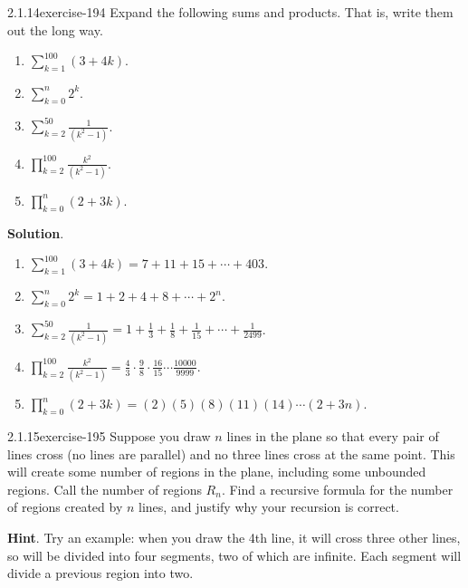 \documentclass[twoside,11pt,]{book}
\numberwithin{equation}{chapter}
\renewcommand{\d}{\displaystyle}
\begin{document}
\begin{divisionsolution}{2.1.14}{}{exercise-194}%
\hypertarget{p-3042}{}%
Expand the following sums and products. That is, write them out the long way.\leavevmode%
\begin{multicols}{2}
\begin{enumerate}[label=(\alph*)]
\item\hypertarget{li-1791}{}\(\d\sum_{k=1}^{100} (3+4k)\).%
\item\hypertarget{li-1792}{}\(\d\sum_{k=0}^n 2^k\).%
\item\hypertarget{li-1793}{}\(\d\sum_{k=2}^{50}\frac{1}{(k^2 - 1)}\).%
\item\hypertarget{li-1794}{}\(\d\prod_{k=2}^{100}\frac{k^2}{(k^2-1)}\).%
\item\hypertarget{li-1795}{}\(\d\prod_{k=0}^n (2+3k)\).%
\end{enumerate}
\end{multicols}
%
\par\smallskip%
\noindent\textbf{Solution}.\quad%
\hypertarget{p-3043}{}%
\leavevmode%
\begin{enumerate}[label=(\alph*)]
\item\hypertarget{li-1796}{}\(\d\sum_{k=1}^{100} (3+4k) = 7 + 11 + 15 + \cdots + 403\).%
\item\hypertarget{li-1797}{}\(\d\sum_{k=0}^n 2^k = 1 + 2 + 4 + 8 + \cdots + 2^n\).%
\item\hypertarget{li-1798}{}\(\d\sum_{k=2}^{50}\frac{1}{(k^2 - 1)} = 1 + \frac{1}{3} + \frac{1}{8} + \frac{1}{15} + \cdots + \frac{1}{2499}\).%
\item\hypertarget{li-1799}{}\(\d\prod_{k=2}^{100}\frac{k^2}{(k^2-1)} = \frac{4}{3}\cdot\frac{9}{8}\cdot\frac{16}{15}\cdots\frac{10000}{9999}\).%
\item\hypertarget{li-1800}{}\(\d\prod_{k=0}^n (2+3k) = (2)(5)(8)(11)(14)\cdots(2+3n)\).%
\end{enumerate}
%
\end{divisionsolution}%
\begin{divisionsolution}{2.1.15}{}{exercise-195}%
\hypertarget{p-3044}{}%
Suppose you draw \(n\) lines in the plane so that every pair of lines cross (no lines are parallel) and no three lines cross at the same point.  This will create some number of regions in the plane, including some unbounded regions.  Call the number of regions \(R_n\).  Find a recursive formula for the number of regions created by \(n\) lines, and justify why your recursion is correct.%
\par\smallskip%
\noindent\textbf{Hint}.\quad%
\hypertarget{p-3045}{}%
Try an example: when you draw the 4th line, it will cross three other lines, so will be divided into four segments, two of which are infinite.  Each segment will divide a previous region into two.%
\end{divisionsolution}%
\end{document}
